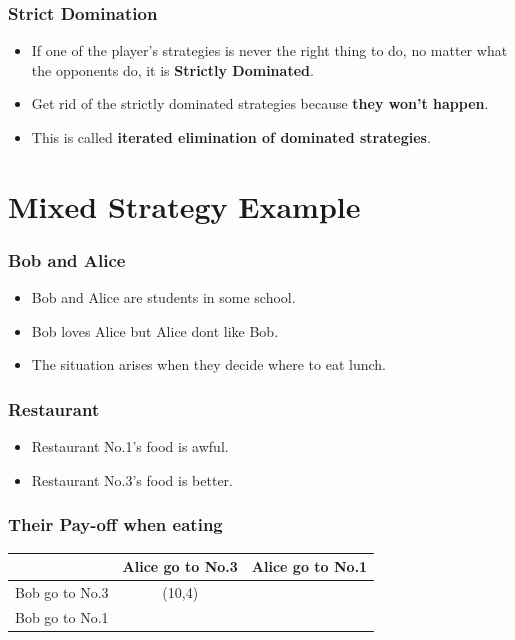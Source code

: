 \documentclass{beamer}
\begin{document}
\begin{frame}
\frametitle{Strict Domination}
\begin{itemize}[<+->]
\item
If one of the player’s strategies is never the right thing to do, no matter what the opponents do, it is \textbf{Strictly Dominated}.
\item
Get rid of the strictly dominated strategies because \textbf{they won't happen}.
\item
This is called \textbf{iterated elimination of dominated strategies}.
\end{itemize}
\end{frame}


\section{Mixed Strategy Example}
\begin{frame}
\frametitle{Bob and Alice}
\begin{itemize}
\item {\color{blue}Bob} and {\color{red} Alice} are students in some school.
\item {\color{blue}Bob} loves {\color{red} Alice} but {\color{red} Alice} dont like {\color{blue}Bob}.
\item The situation arises when they decide where to eat lunch.
\end{itemize}
\end{frame}

\begin{frame}
\frametitle{Restaurant}
\begin{itemize}
\item Restaurant No.1's food is awful.
\item Restaurant No.3's food is better.
\end{itemize}

\end{frame}

\begin{frame}
\frametitle{Their Pay-off when eating}
\begin{tabular}{|c|c|c|}
\hline
\hline
    & {\color{red}Alice} go to No.3 & {\color{red}Alice} go to No.1\\
\hline
{\color{blue}Bob} go to No.3 & ({\color{blue}10},{\color{red}4}) & \\
\hline
{\color{blue}Bob} go to No.1 &  & \\
\hline
\hline
\end{tabular}
\end{frame}
\end{document}
